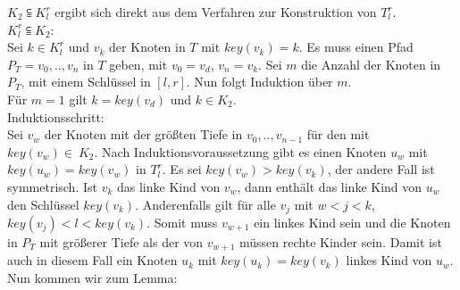 \documentclass[a4paper,12pt]{article}
\begin{document}
 \noindent $K_2 \subseteqq  K^r_l$ ergibt sich direkt aus dem Verfahren zur Konstruktion von $T^r_l$.\\
 
 \noindent $ K^r_l \subseteqq K_2$:\\
 Sei $k \in K^r_l$ und $v_k$ der Knoten in $T$ mit $\mathit{key}(v_k) = k$. Es muss einen Pfad $P_T = v_0,..,v_n$ in $T$ geben, mit $v_0 = v_d$, $v_n = v_k$. Sei $m$ die Anzahl der Knoten in $P_T$, mit einem Schlüssel in  $\left[l,r\right]$. Nun folgt Induktion über $m$.\\
  Für $m = 1$ gilt $k = \mathit{key}\left(v_d\right)$  und $k \in K_2$. \\
  Induktionsschritt:\\
  Sei $v_w$ der Knoten mit der größten Tiefe in $ v_0,..,v_{n-1}$ für den mit $\mathit{key}(v_w) \in~K_2$. Nach Induktionsvoraussetzung gibt es einen Knoten $u_w$ mit $\mathit{key}(u_w) = \mathit{key}(v_w)$ in $T^r_l$.  Es sei $\mathit{key}(v_w) > \mathit{key}(v_k)$, der andere Fall ist symmetrisch. Ist $v_k$ das linke Kind von $v_w$, dann enthält das linke Kind von $u_w$ den Schlüssel $\mathit{key}(v_k)$. Anderenfalls gilt für alle $v_j$ mit $w < j < k$, $\mathit{key}(v_j) < l < \mathit{key}(v_k)$. Somit muss $v_{w+1}$ ein linkes Kind sein und die Knoten in $P_T$ mit größerer Tiefe als der von $v_{w+1}$ müssen rechte Kinder sein. Damit ist auch in diesem Fall ein Knoten $u_k$ mit $\mathit{key}(u_k) = \mathit{key}(v_k)$ linkes Kind von $u_w$.  \\
  
 \noindent Nun kommen wir zum Lemma:\\
 
 


	    
	 
\end{document}
